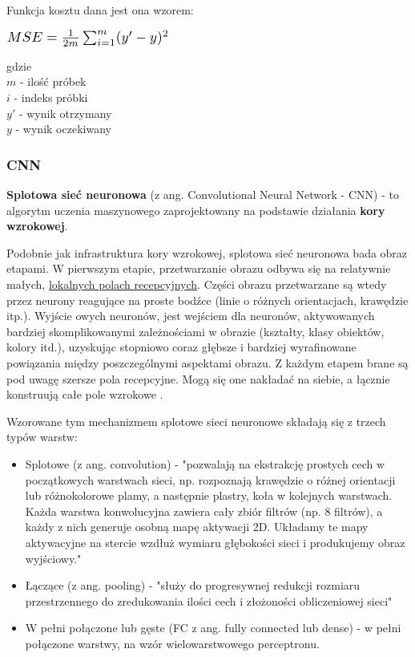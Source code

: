 Funkcja kosztu dana jest ona wzorem:
\begin{center}
\begin{math}
\resizebox{0.42\hsize}{!}{$%
    MSE = \frac{1}{2m}\sum_{i = 1}^{m} ({y}' - y)^{2}
    $%
    }%
\end{math}
\end{center}
gdzie\\
$m$ - ilość próbek\\
$i$ - indeks próbki\\
\begin{math}
{y}'
\end{math}
- wynik otrzymany\\
$y$ - wynik oczekiwany\\

\subsubsection{CNN}

\begin{description}
    \item{
        \textbf{Splotowa sieć neuronowa} (z ang. Convolutional Neural Network - CNN) - to algorytm uczenia maszynowego zaprojektowany na podstawie działania \textbf{kory wzrokowej}. 
        
        Podobnie jak infrastruktura kory wzrokowej, splotowa sieć neuronowa bada obraz etapami. W pierwszym etapie, przetwarzanie obrazu odbywa się na relatywnie małych, \underline{lokalnych polach recepcyjnych}. Części obrazu przetwarzane są wtedy przez neurony reagujące na proste bodźce (linie o różnych orientacjach, krawędzie itp.). Wyjście owych neuronów, jest wejściem dla neuronów, aktywowanych bardziej skomplikowanymi zależnościami w obrazie (kształty, klasy obiektów, kolory itd.), uzyskując stopniowo coraz głębsze i bardziej wyrafinowane powiązania między poszczególnymi aspektami obrazu. Z każdym etapem brane są pod uwagę szersze pola recepcyjne. Mogą się one nakładać na siebie, a łącznie konstruują całe pole wzrokowe \cite{cnn_wroc}.
    }
\end{description}

Wzorowane tym mechanizmem splotowe sieci neuronowe składają się z trzech typów warstw:
\begin{itemize}
    \item Splotowe (z ang. convolution) - "pozwalają na ekstrakcję prostych cech w początkowych warstwach sieci, np. rozpoznają krawędzie o różnej orientacji lub różnokolorowe plamy, a następnie plastry, koła w kolejnych warstwach. Każda warstwa konwolucyjna zawiera cały zbiór filtrów (np. 8 filtrów), a każdy z nich generuje osobną mapę aktywacji 2D. Układamy te mapy aktywacyjne na stercie wzdłuż wymiaru głębokości sieci i produkujemy obraz wyjściowy." \cite{cnn_agh}
    \item Łączące (z ang. pooling) - "\null{}służy do progresywnej redukcji rozmiaru przestrzennego do
zredukowania ilości cech i złożoności obliczeniowej sieci" \cite{cnn_agh}
    \item W pełni połączone lub gęste (FC z ang. fully connected lub dense) - w pełni połączone warstwy, na wzór wielowarstwowego perceptronu.
\end{itemize}

